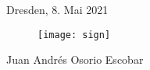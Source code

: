 \begin{flushleft}
Dresden, 8. Mai 2021 \\
\begin{figure}[h!]
  \texttt{[image: sign]}
\end{figure}
Juan Andrés Osorio Escobar
\end{flushleft}
